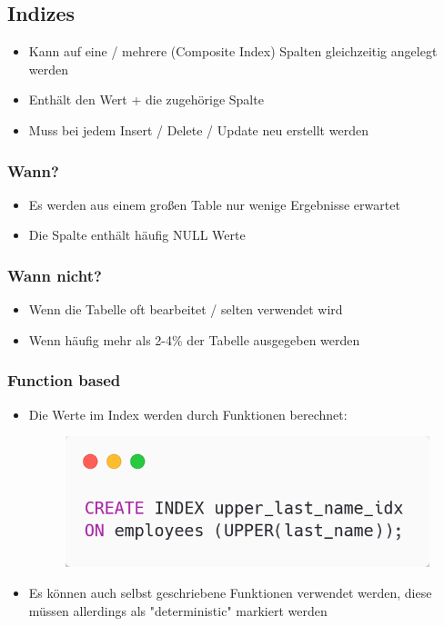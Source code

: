 \subsection{Indizes}
\begin{itemize}
    \item Kann auf eine / mehrere (Composite Index) Spalten gleichzeitig angelegt werden
    \item Enthält den Wert + die zugehörige Spalte
    \item Muss bei jedem Insert / Delete / Update neu erstellt werden
\end{itemize}

\subsubsection{Wann?}
\begin{itemize}
    \item Es werden aus einem großen Table nur wenige Ergebnisse erwartet
    \item Die Spalte enthält häufig NULL Werte
\end{itemize}

\subsubsection{Wann nicht?}
\begin{itemize}
    \item Wenn die Tabelle oft bearbeitet / selten verwendet wird
    \item Wenn häufig mehr als 2-4\% der Tabelle ausgegeben werden
\end{itemize}

\subsubsection{Function based}
\begin{itemize}
    \item Die Werte im Index werden durch Funktionen berechnet:
    \begin{figure}[H]
        \centering
        \includegraphics[scale=.4]{res/themenkorb_2/function_based.png} 
    \end{figure}
    \item Es können auch selbst geschriebene Funktionen verwendet werden, diese müssen allerdings als "deterministic" markiert werden
\end{itemize}

